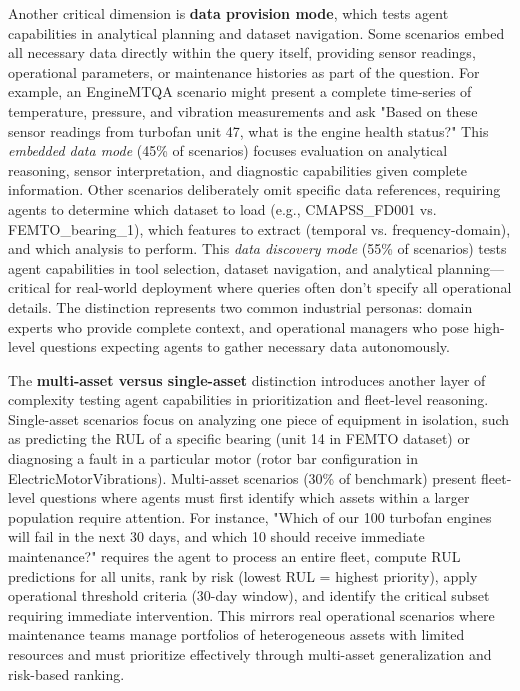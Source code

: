 \documentclass[sigconf]{acmart}
\begin{document}
Another critical dimension is \textbf{data provision mode}, which tests agent capabilities in analytical planning and dataset navigation. Some scenarios embed all necessary data directly within the query itself, providing sensor readings, operational parameters, or maintenance histories as part of the question. For example, an EngineMTQA scenario might present a complete time-series of temperature, pressure, and vibration measurements and ask "Based on these sensor readings from turbofan unit 47, what is the engine health status?" This \textit{embedded data mode} (45\% of scenarios) focuses evaluation on analytical reasoning, sensor interpretation, and diagnostic capabilities given complete information. Other scenarios deliberately omit specific data references, requiring agents to determine which dataset to load (e.g., CMAPSS\_FD001 vs. FEMTO\_bearing\_1), which features to extract (temporal vs. frequency-domain), and which analysis to perform. This \textit{data discovery mode} (55\% of scenarios) tests agent capabilities in tool selection, dataset navigation, and analytical planning---critical for real-world deployment where queries often don't specify all operational details. The distinction represents two common industrial personas: domain experts who provide complete context, and operational managers who pose high-level questions expecting agents to gather necessary data autonomously.

The \textbf{multi-asset versus single-asset} distinction introduces another layer of complexity testing agent capabilities in prioritization and fleet-level reasoning. Single-asset scenarios focus on analyzing one piece of equipment in isolation, such as predicting the RUL of a specific bearing (unit 14 in FEMTO dataset) or diagnosing a fault in a particular motor (rotor bar configuration in ElectricMotorVibrations). Multi-asset scenarios (30\% of benchmark) present fleet-level questions where agents must first identify which assets within a larger population require attention. For instance, "Which of our 100 turbofan engines will fail in the next 30 days, and which 10 should receive immediate maintenance?" requires the agent to process an entire fleet, compute RUL predictions for all units, rank by risk (lowest RUL = highest priority), apply operational threshold criteria (30-day window), and identify the critical subset requiring immediate intervention. This mirrors real operational scenarios where maintenance teams manage portfolios of heterogeneous assets with limited resources and must prioritize effectively through multi-asset generalization and risk-based ranking.
\end{document}
